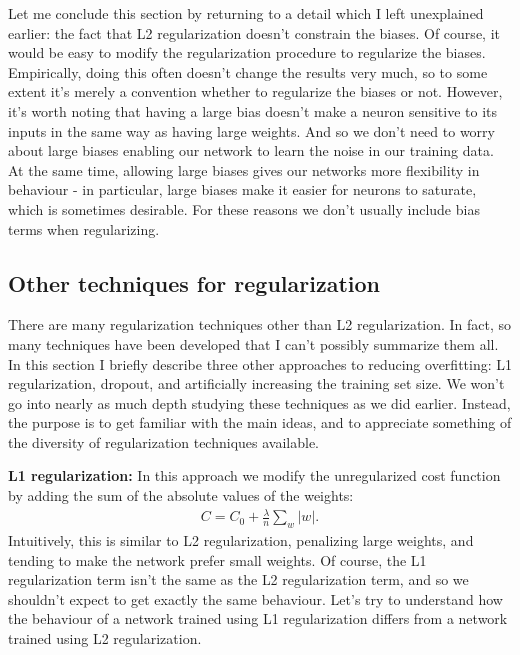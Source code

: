\documentclass[a4paper,twoside,10pt]{book}
\begin{document}
Let me conclude this section by returning to a detail which I left unexplained earlier: the fact that L2 regularization doesn't constrain the biases. Of course, it would be easy to modify the regularization procedure to regularize the biases. Empirically, doing this often doesn't change the results very much, so to some extent it's merely a convention whether to regularize the biases or not. However, it's worth noting that having a large bias doesn't make a neuron sensitive to its inputs in the same way as having large weights. And so we don't need to worry about large biases enabling our network to learn the noise in our training data. At the same time, allowing large biases gives our networks more flexibility in behaviour - in particular, large biases make it easier for neurons to saturate, which is sometimes desirable. For these reasons we don't usually include bias terms when regularizing.


\subsection{Other techniques for regularization}
There are many regularization techniques other than L2 regularization. In fact, so many techniques have been developed that I can't possibly summarize them all. In this section I briefly describe three other approaches to reducing overfitting: L1 regularization, dropout, and artificially increasing the training set size. We won't go into nearly as much depth studying these techniques as we did earlier. Instead, the purpose is to get familiar with the main ideas, and to appreciate something of the diversity of regularization techniques available.

\textbf{L1 regularization:} In this approach we modify the unregularized cost function by adding the sum of the absolute values of the weights:
\begin{eqnarray}  C = C_0 + \frac{\lambda}{n} \sum_w |w|.\label{eq:95}
\end{eqnarray}
Intuitively, this is similar to L2 regularization, penalizing large weights, and tending to make the network prefer small weights. Of course, the L1 regularization term isn't the same as the L2 regularization term, and so we shouldn't expect to get exactly the same behaviour. Let's try to understand how the behaviour of a network trained using L1 regularization differs from a network trained using L2 regularization.
\end{document}
